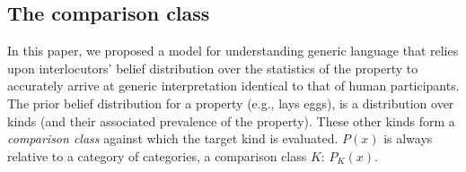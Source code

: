 \documentclass[12pt,letterpaper]{article}
\newcommand{\ndg}[1]{\textcolor{Green}{[ndg: #1]}}
\begin{document}




\subsection*{The comparison class}
In this paper, we proposed a model for understanding generic language that relies upon interlocutors' belief distribution over the statistics of the property to accurately arrive at generic interpretation identical to that of human participants. 
The prior belief distribution for a property (e.g., lays eggs), is a distribution over kinds (and their associated prevalence of the property).
These other kinds form a \emph{comparison class} against which the target kind is evaluated. 
$P(x)$ is always relative to a category of categories, a comparison class $K$: $P_K(x)$.
\end{document}
